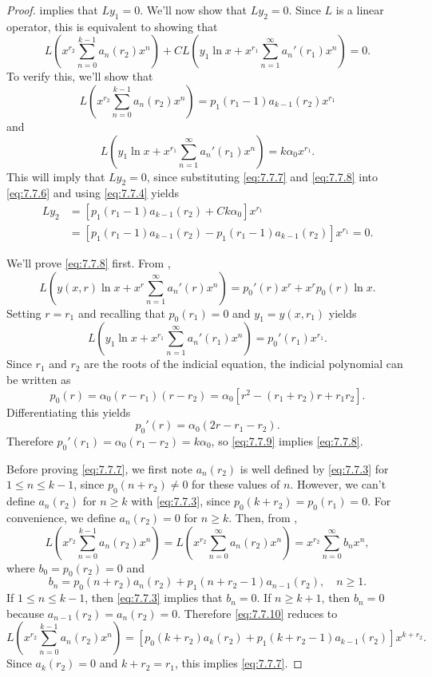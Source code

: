 \begin{proof}
 implies that $Ly_1=0$.
We'll now show that $Ly_2=0$.
Since $L$  is a linear operator, this is equivalent to
showing that
\begin{equation} \label{eq:7.7.6}
L\left(
x^{r_2}\sum_{n=0}^{k-1}a_n(r_2)x^n\right)+CL\left(y_1\ln
x+x^{r_1}\sum_{n=1}^\infty a_n'(r_1)x^n\right)=0.
\end{equation}
To verify this, we'll show that
\begin{equation} \label{eq:7.7.7}
L\left(x^{r_2}\sum_{n=0}^{k-1}
a_n(r_2)x^n\right)=p_1(r_1-1)a_{k-1}(r_2)x^{r_1}
\end{equation}
and
\begin{equation} \label{eq:7.7.8}
L\left(y_1\ln x+x^{r_1}\sum_{n=1}^\infty
a_n'(r_1)x^n\right)=k\alpha_0x^{r_1}.
\end{equation}
This will imply that $Ly_2=0$, since substituting \eqref{eq:7.7.7}
and \eqref{eq:7.7.8} into \eqref{eq:7.7.6} and using \eqref{eq:7.7.4}
yields
\begin{align*}
Ly_2&=\left[p_1(r_1-1)a_{k-1}(r_2)+Ck\alpha_0\right]x^{r_1}\\
&=\left[p_1(r_1-1)a_{k-1}(r_2)-p_1(r_1-1)a_{k-1}(r_2)\right]x^{r_1}=0.
\end{align*}


We'll prove \eqref{eq:7.7.8} first. From
,
\[
L\left(y(x,r)\ln x+x^r\sum_{n=1}^\infty
a_n'(r)x^n\right)=p_0'(r)x^r+x^rp_0(r)\ln x.
\]
Setting $r=r_1$ and recalling that $p_0(r_1)=0$ and $y_1=y(x,r_1)$
yields
\begin{equation} \label{eq:7.7.9}
L\left(y_1\ln x+x^{r_1}\sum_{n=1}^\infty
a_n'(r_1)x^n\right)=p_0'(r_1)x^{r_1}.
\end{equation}
Since $r_1$ and $r_2$ are the roots of the indicial equation, the
indicial polynomial can be written as
\[
p_0(r)=\alpha_0(r-r_1)(r-r_2)=\alpha_0\left[r^2-(r_1+r_2)r+r_1r_2\right].
\]
Differentiating this yields
\[
p_0'(r)=\alpha_0(2r-r_1-r_2).
\]
Therefore $p_0'(r_1)=\alpha_0(r_1-r_2)=k\alpha_0$,
so \eqref{eq:7.7.9} implies \eqref{eq:7.7.8}.

Before proving \eqref{eq:7.7.7}, we first note $a_n(r_2)$ is well
defined by \eqref{eq:7.7.3} for $1\le n\le k-1$, since $p_0(n+r_2)\ne0$
for these values of $n$. However, we can't define $a_n(r_2)$ for
$n\ge k$ with \eqref{eq:7.7.3}, since $p_0(k+r_2)=p_0(r_1)=0$.
For convenience, we define  $a_n(r_2)=0$ for $n\ge k$. Then, from
,
\begin{equation} \label{eq:7.7.10}
L\left(x^{r_2}\sum_{n=0}^{k-1} a_n(r_2)x^n\right)=
L\left(x^{r_2}\sum_{n=0}^\infty a_n(r_2)x^n\right)=
x^{r_2}\sum_{n=0}^\infty b_nx^n,
\end{equation}
where $b_0=p_0(r_2)=0$  and
\[
b_n=p_0(n+r_2)a_n(r_2)+p_1(n+r_2-1)a_{n-1}(r_2),\quad n\ge1.
\]
If $1\le n\le k-1$, then \eqref{eq:7.7.3} implies that $b_n=0$.
If $n\ge k+1$, then $b_n=0$  because $a_{n-1}(r_2)=a_n(r_2)=0$.
Therefore \eqref{eq:7.7.10} reduces to
\[
L\left(x^{r_2}\sum_{n=0}^{k-1} a_n(r_2)x^n\right)=
\left[p_0(k+r_2)a_k(r_2)+p_1(k+r_2-1)a_{k-1}(r_2)
\right]x^{k+r_2}.
\]
Since $a_k(r_2)=0$ and $k+r_2=r_1$, this implies \eqref{eq:7.7.7}.
\end{proof}

